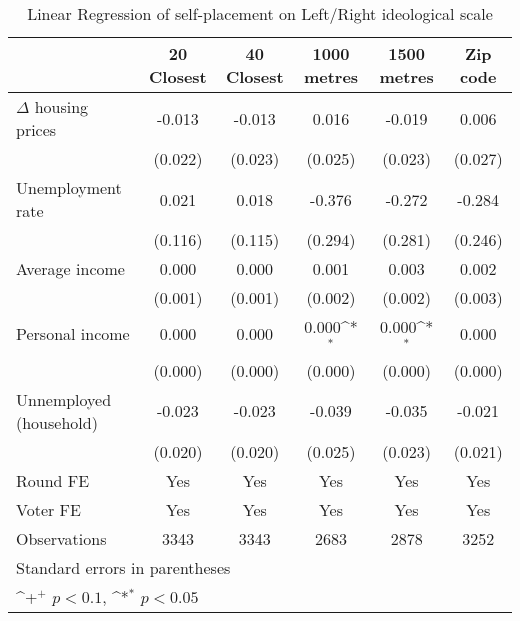 \begin{table}[htbp]\centering
\def\sym#1{\ifmmode^{#1}\else\(^{#1}\)\fi}
\caption{Linear Regression of self-placement on Left/Right ideological scale } \label{indaltdv}
\begin{tabular}{l*{5}{c}}
\hline\hline
                    &\multicolumn{1}{c}{20 Closest}&\multicolumn{1}{c}{40 Closest}&\multicolumn{1}{c}{1000 metres}&\multicolumn{1}{c}{1500 metres}&\multicolumn{1}{c}{Zip code}\\
\hline
$\Delta$ housing prices&      -0.013       &      -0.013       &       0.016       &      -0.019       &       0.006       \\
                    &     (0.022)       &     (0.023)       &     (0.025)       &     (0.023)       &     (0.027)       \\
[1em]
Unemployment rate   &       0.021       &       0.018       &      -0.376       &      -0.272       &      -0.284       \\
                    &     (0.116)       &     (0.115)       &     (0.294)       &     (0.281)       &     (0.246)       \\
[1em]
Average income      &       0.000       &       0.000       &       0.001       &       0.003       &       0.002       \\
                    &     (0.001)       &     (0.001)       &     (0.002)       &     (0.002)       &     (0.003)       \\
[1em]
Personal income     &       0.000       &       0.000       &       0.000\sym{*}&       0.000\sym{*}&       0.000       \\
                    &     (0.000)       &     (0.000)       &     (0.000)       &     (0.000)       &     (0.000)       \\
[1em]
Unnemployed (household)&      -0.023       &      -0.023       &      -0.039       &      -0.035       &      -0.021       \\
                    &     (0.020)       &     (0.020)       &     (0.025)       &     (0.023)       &     (0.021)       \\
[1em]
\hline  Round FE    &         Yes       &         Yes       &         Yes       &         Yes       &         Yes       \\
[1em]
Voter FE            &         Yes       &         Yes       &         Yes       &         Yes       &         Yes       \\
\hline
Observations        &        3343       &        3343       &        2683       &        2878       &        3252       \\
\hline\hline
\multicolumn{6}{l}{\footnotesize Standard errors in parentheses}\\
\multicolumn{6}{l}{\footnotesize \sym{+} \(p<0.1\), \sym{*} \(p<0.05\)}\\
\end{tabular}
\end{table}
